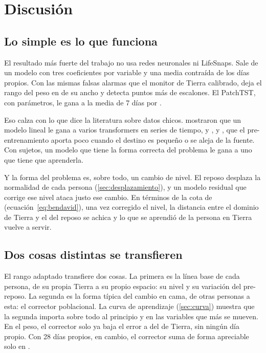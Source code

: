 \chapter{Discusión}\label{cap:discusion}

\section{Lo simple es lo que funciona}

El resultado más fuerte del trabajo no usa redes neuronales ni LifeSnaps. Sale de un modelo con tres coeficientes por
variable y una media contraída de los días propios. Con las mismas falsas alarmas que el monitor de Tierra calibrado,
deja el rango del peso en  de su ancho y detecta  puntos más de escalones.
El PatchTST, con  parámetros, le gana a la media de 7 días por .

Eso calza con lo que dice la literatura sobre datos chicos. \textcite{zeng2023} mostraron que un modelo lineal le gana
a varios transformers en series de tiempo, y \textcite{he2019}, \textcite{raghu2019} y \textcite{kornblith2019}, que el
pre-entrenamiento aporta poco cuando el destino es pequeño o se aleja de la fuente. Con  sujetos,
un modelo que tiene la forma correcta del problema le gana a uno que tiene que aprenderla.

Y la forma del problema es, sobre todo, un cambio de nivel. El reposo desplaza la normalidad de cada persona
(\cref{sec:desplazamiento}), y un modelo residual que corrige ese nivel ataca justo ese cambio. En términos de la cota
de \textcite{bendavid2010} (ecuación~\ref{eq:bendavid}), una vez corregido el nivel, la distancia entre el dominio de Tierra y
el del reposo se achica y lo que se aprendió de la persona en Tierra vuelve a servir.

\section{Dos cosas distintas se transfieren}

El rango adaptado transfiere dos cosas. La primera es la línea base de cada persona, de su propia Tierra a su propio
espacio: su nivel y su variación del pre-reposo. La segunda es la forma típica del cambio en cama, de otras personas a
esta: el corrector poblacional. La curva de aprendizaje (\cref{sec:curva}) muestra que la segunda importa sobre todo
al principio y en las variables que más se mueven. En el peso, el corrector solo ya baja el error a
 del de Tierra, sin ningún día propio. Con 28 días propios, en cambio, el corrector suma de
forma apreciable solo en .

